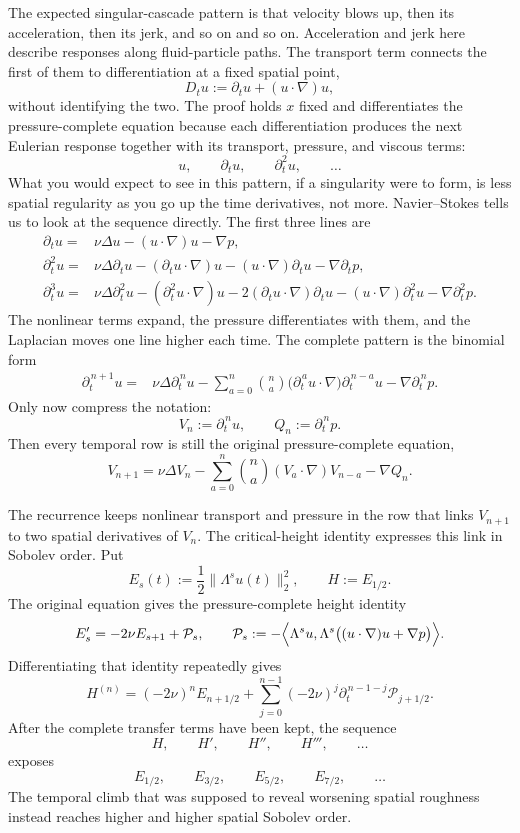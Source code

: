 \documentclass[11pt]{article}
\begin{document}
The expected singular-cascade pattern is that velocity blows up, then its acceleration, then its jerk, and so on and so on.
Acceleration and jerk here describe responses along fluid-particle paths.  The transport term connects the first of them to differentiation at a fixed spatial point,
\[
D_tu:=\partial_tu+(u\cdot\nabla)u,
\]
without identifying the two.  The proof holds \(x\) fixed and differentiates the pressure-complete equation because each differentiation produces the next Eulerian response together with its transport, pressure, and viscous terms:
\[
u,\qquad \partial_tu,\qquad \partial_t^2u,\qquad \ldots
\]
What you would expect to see in this pattern, if a singularity were to form, is less spatial regularity as you go up the time derivatives, not more.  Navier--Stokes tells us to look at the sequence directly.  The first three lines are
\[
\begin{aligned}
\partial_tu={}&\nu\Delta u-(u\cdot\nabla)u-\nabla p,\\
\partial_t^2u={}&\nu\Delta\partial_tu
-(\partial_tu\cdot\nabla)u
-(u\cdot\nabla)\partial_tu
-\nabla\partial_tp,\\
\partial_t^3u={}&\nu\Delta\partial_t^2u
-(\partial_t^2u\cdot\nabla)u
-2(\partial_tu\cdot\nabla)\partial_tu
-(u\cdot\nabla)\partial_t^2u
-\nabla\partial_t^2p.
\end{aligned}
\]
The nonlinear terms expand, the pressure differentiates with them, and the Laplacian moves one line higher each time.  The complete pattern is the binomial form
\[
\begin{aligned}
\partial_t^{\,n+1}u={}&\nu\Delta\partial_t^{\,n}u
-\sum_{a=0}^{n}\binom{n}{a}
\bigl(\partial_t^{\,a}u\cdot\nabla\bigr)
\partial_t^{\,n-a}u
-\nabla\partial_t^{\,n}p.
\end{aligned}
\]
Only now compress the notation:
\[
V_n:=\partial_t^{\,n}u,
\qquad
Q_n:=\partial_t^{\,n}p.
\]
Then every temporal row is still the original pressure-complete equation,
\[
V_{n+1}
=\nu\Delta V_n
-\sum_{a=0}^{n}\binom{n}{a}(V_a\cdot\nabla)V_{n-a}
-\nabla Q_n.
\]

The recurrence keeps nonlinear transport and pressure in the row that links \(V_{n+1}\) to two spatial derivatives of \(V_n\).  The critical-height identity expresses this link in Sobolev order.  Put
\[
E_s(t):=\frac12\|\Lambda^su(t)\|_2^2,
\qquad H:=E_{1/2}.
\]
The original equation gives the pressure-complete height identity
\[
E_s'=-2\nu E_{s+1}+\mathcal P_s,
\qquad
\mathcal P_s
:=-\Bigl\langle \Lambda^su,
\Lambda^s\bigl((u\cdot\nabla)u+\nabla p\bigr)\Bigr\rangle.
\]
Differentiating that identity repeatedly gives
\[
H^{(n)}
=(-2\nu)^nE_{n+1/2}
+\sum_{j=0}^{n-1}(-2\nu)^j
\partial_t^{\,n-1-j}\mathcal P_{j+1/2}.
\]
After the complete transfer terms have been kept, the sequence
\[
H,\qquad H',\qquad H'',\qquad H''',\qquad\ldots
\]
exposes
\[
E_{1/2},\qquad E_{3/2},\qquad E_{5/2},\qquad E_{7/2},\qquad\ldots
\]
The temporal climb that was supposed to reveal worsening spatial roughness instead reaches higher and higher spatial Sobolev order.
\end{document}

